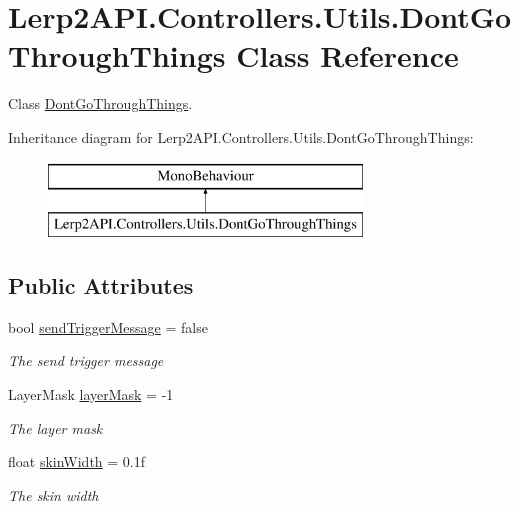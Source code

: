 \hypertarget{class_lerp2_a_p_i_1_1_controllers_1_1_utils_1_1_dont_go_through_things}{}\section{Lerp2\+A\+P\+I.\+Controllers.\+Utils.\+Dont\+Go\+Through\+Things Class Reference}
\label{class_lerp2_a_p_i_1_1_controllers_1_1_utils_1_1_dont_go_through_things}


Class \hyperlink{class_lerp2_a_p_i_1_1_controllers_1_1_utils_1_1_dont_go_through_things}{Dont\+Go\+Through\+Things}.  


Inheritance diagram for Lerp2\+A\+P\+I.\+Controllers.\+Utils.\+Dont\+Go\+Through\+Things\+:\begin{figure}[H]
\begin{center}
\leavevmode
\includegraphics[height=2.000000cm]{class_lerp2_a_p_i_1_1_controllers_1_1_utils_1_1_dont_go_through_things}
\end{center}
\end{figure}
\subsection*{Public Attributes}
\begin{DoxyCompactItemize}
\item 
bool \hyperlink{class_lerp2_a_p_i_1_1_controllers_1_1_utils_1_1_dont_go_through_things_aa16b4c40889b1316b71b36c1cbe23fd2}{send\+Trigger\+Message} = false
\begin{DoxyCompactList}\small\item\em The send trigger message \end{DoxyCompactList}\item 
Layer\+Mask \hyperlink{class_lerp2_a_p_i_1_1_controllers_1_1_utils_1_1_dont_go_through_things_a4f822a7038743a6e7963349d1990e981}{layer\+Mask} = -\/1
\begin{DoxyCompactList}\small\item\em The layer mask \end{DoxyCompactList}\item 
float \hyperlink{class_lerp2_a_p_i_1_1_controllers_1_1_utils_1_1_dont_go_through_things_acec21b0fc36da28d3ddee88385d3b5df}{skin\+Width} = 0.\+1f
\begin{DoxyCompactList}\small\item\em The skin width \end{DoxyCompactList}\end{DoxyCompactItemize}


